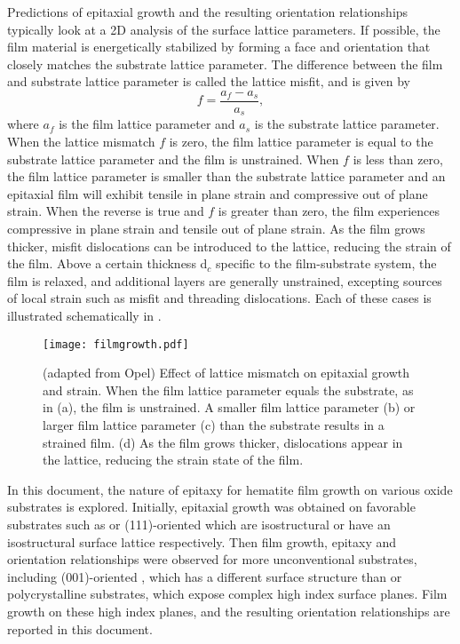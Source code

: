 Predictions of epitaxial growth and the resulting orientation relationships typically look at a 2\textsc{D} analysis of the surface lattice parameters. If possible, the film material is energetically stabilized by forming a face and orientation that closely matches the substrate lattice parameter. The difference between the film and substrate lattice parameter is called the lattice misfit, and is given by 
\begin{equation}
f=\frac{a_{f}-a_{s}}{a_{s}},
\end{equation}
where $a_{f}$ is the film lattice parameter and $a_{s}$ is the substrate lattice parameter.\cite{Opel:2012ge} When the lattice mismatch $f$ is zero, the film lattice parameter is equal to the substrate lattice parameter and the film is unstrained. When $f$ is less than zero, the film lattice parameter is smaller than the substrate lattice parameter and an epitaxial film will exhibit tensile in plane strain and compressive out of plane strain. When the reverse is true and $f$ is greater than zero, the film experiences compressive in plane strain and tensile out of plane strain. As the film grows thicker, misfit dislocations can be introduced to the lattice, reducing the strain of the film. Above a certain thickness d$_{c}$ specific to the film-substrate system, the film is relaxed, and additional layers are generally unstrained, excepting sources of local strain such as misfit and threading dislocations. Each of these cases is illustrated schematically in .
\begin{figure}
	\texttt{[image: filmgrowth.pdf]}
		\caption[Strain in thin film growth]{%
			(adapted from Opel\citep{Opel:2012ge}) Effect of lattice mismatch 
			on epitaxial growth and strain.
			When the film lattice parameter equals the substrate, as in (a),
			the film is unstrained. A smaller film lattice parameter (b) or
			larger film lattice parameter (c) than the substrate results in
			a strained film. (d) As the film grows thicker, dislocations appear
			in the lattice, reducing the strain state of the film.}
	\label{fig:filmgrowth}
\end{figure}

In this document, the nature of epitaxy for hematite film growth on various oxide substrates is explored. Initially, epitaxial growth was obtained on favorable substrates such as  or (111)-oriented  which are isostructural or have an isostructural surface lattice respectively. Then film growth, epitaxy and orientation relationships were observed for more unconventional substrates, including (001)-oriented , which has a different surface structure than  or polycrystalline substrates, which expose complex high index surface planes. Film growth on these high index planes, and the resulting orientation relationships are reported in this document.

